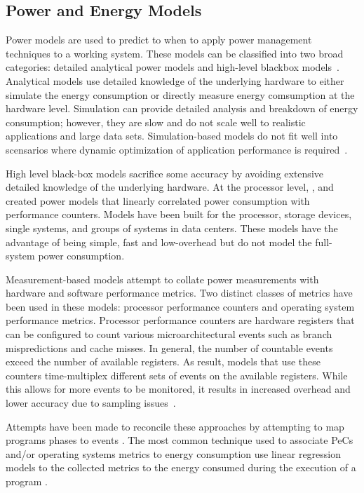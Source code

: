 \documentclass[times,12pt,onecolumn]{article}
\begin{document}
\subsection{Power and Energy Models}
\label{sec:models}
Power models are used to predict to when to apply power management
techniques to a working system. These models can be classified into two
broad categories: detailed analytical power models and high-level
blackbox models~\cite{Rivoire2008b}. Analytical models use detailed
knowledge of the underlying hardware to either simulate the energy
consumption or directly measure energy comsumption at the hardware
level.  Simulation can provide detailed analysis and breakdown of energy
consumption; however, they are slow and do not scale well to realistic
applications and large data sets.  Simulation-based models do not fit
well into scensarios where dynamic optimization of application
performance is required~\cite{Economou2006}. 

High level black-box models sacrifice some accuracy by avoiding
extensive detailed knowledge of the underlying hardware.  At the
processor level, \cite{Contreras2005}, and \cite{Bellosa2003} created
power models that linearly correlated power consumption with performance
counters. Models have been built for the processor, storage devices,
single systems, and groups of systems in data centers.  These models
have the advantage of being simple, fast and low-overhead but do not
model the full-system power consumption.

Measurement-based models attempt to collate power measurements with
hardware and software performance metrics.  Two distinct classes of
metrics have been used in these models: processor performance counters
and operating system performance metrics.  Processor performance
counters are hardware registers that can be configured to count various
microarchitectural events such as branch mispredictions and cache
misses.  In general, the number of countable events exceed the number of
available registers.  As result, models that use these counters
time-multiplex different sets of events on the available registers.
While this allows for more events to be monitored, it results in
increased overhead and lower accuracy due to sampling
issues~\cite{Economou2006}\cite{Rivoire2008a}.

Attempts have been made to reconcile these approaches by attempting to
map programs phases to events \cite{Isci2006}.  The most common
technique used to associate PeCs and/or operating systems metrics to
energy consumption use linear regression models to the collected metrics
to the energy consumed during the execution of a program
\cite{Contreras2005}\cite{Economou2006}\cite{Isci2003b}\cite{Bircher2007}.
\end{document}
